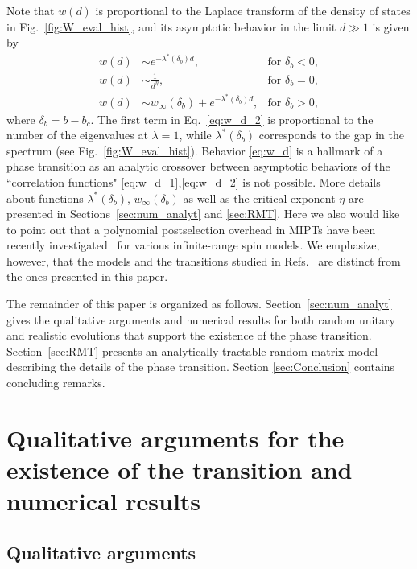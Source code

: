 \documentclass[%
 reprint,
 superscriptaddress,
 amsmath,amssymb,
prx,
]{revtex4-2}\href{\href{}{}}{}
\begin{document}
Note that $w(d)$ is proportional to the Laplace transform of the density of states in Fig.~\ref{fig:W_eval_hist}, and its asymptotic behavior in the limit $d\gg1$ is given by
\begin{subequations}\label{eq:w_d}
\begin{align}
    w(d) &\sim e^{-\lambda^{\ast}(\delta_b)d}, &\text{for ${\delta_b<0}$}, \label{eq:w_d_1}  \\
    w(d) &\sim \frac{1}{d^{\eta}}, &\text{for ${\delta_b=0}$}, \label{eq:w_d_0}  \\
    w(d) &\sim w_{\infty}(\delta_b) + e^{-\lambda^{\ast}(\delta_b)d}, &\text{for ${\delta_b>0}$} ,\label{eq:w_d_2}
\end{align}
\end{subequations}
where $\delta_b = b-b_c$.
The first term in Eq.~\eqref{eq:w_d_2} is proportional to the number of the eigenvalues at $\lambda=1$, while $\lambda^{\ast}(\delta_b)$ corresponds to the gap in the spectrum (see Fig.~\ref{fig:W_eval_hist}).
Behavior \eqref{eq:w_d} is a hallmark of a phase transition as an analytic crossover between asymptotic behaviors of the ``correlation functions" \eqref{eq:w_d_1},\eqref{eq:w_d_2} is not possible.
More details about functions $\lambda^{\ast}(\delta_b)$, $w_{\infty}(\delta_b)$ as well as the critical exponent $\eta$ are presented in Sections~\ref{sec:num_analyt} and \ref{sec:RMT}.
Here we also would like to point out that a polynomial postselection overhead in MIPTs have been recently investigated~\cite{Passarelli2024,Delmonte2024} for various infinite-range spin models.
We emphasize, however, that the models and the transitions studied in Refs.~\cite{Passarelli2024,Delmonte2024} are distinct from the ones presented in this paper.

The remainder of this paper is organized as follows.
Section~\ref{sec:num_analyt} gives the qualitative arguments and numerical results for both random unitary and realistic evolutions that support the existence of the phase transition.
Section~\ref{sec:RMT} presents an analytically tractable random-matrix model describing the details of the phase transition.
Section \ref{sec:Conclusion} contains concluding remarks. 


\section{\label{sec:num_analyt}Qualitative arguments for the existence of the transition and numerical results}

\subsection{\label{sec:qualit_arg}Qualitative arguments}
\end{document}
